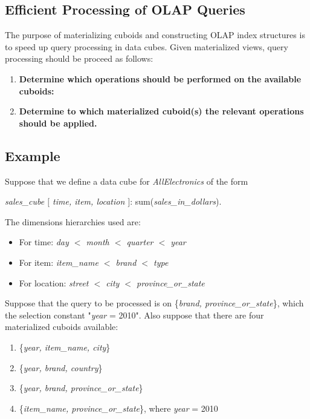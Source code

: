 	\clearpage
	\subsection{Efficient Processing of OLAP Queries}

		The purpose of materializing cuboids and constructing OLAP index structures is to
		speed up query processing in data cubes. Given materialized views, query processing
		should be proceed as follows:

			\begin{enumerate}
				\item {\bf Determine which operations should be performed on the available cuboids:}
				\item {\bf Determine to which materialized cuboid(s) the relevant operations should
				be applied.}
			\end{enumerate}

		\subsection*{Example} 
		Suppose that we define a data cube for {\it AllElectronics} of the form

		{\it sales\_cube $[$ time, item, location $]$}: sum({\it sales\_in\_dollars}).

		The dimensions hierarchies used are:
			\begin{itemize}
				\item For time: {\it day $<$ month $<$ quarter $<$ year}
				\item For item: {\it item\_name $<$ brand $<$ type}
				\item For location: {\it street $<$ city $<$ province\_or\_state}
			\end{itemize}

		Suppose that the query to be processed is on \{{\it brand, province\_or\_state}\},
		which the selection constant "{\it year} = 2010". Also suppose that there are four
		materialized cuboids available:

		\begin{enumerate}
			\item \{{\it year, item\_name, city}\}
			\item \{{\it year, brand, country}\}
			\item \{{\it year, brand, province\_or\_state}\}
			\item \{{\it item\_name, province\_or\_state}\}, where {\it year} = 2010
		\end{enumerate}

